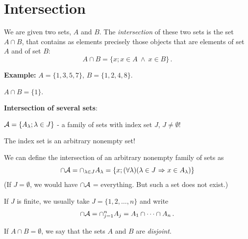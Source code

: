 \documentclass[11pt,paper=b5,footinclude,headinclude]{scrbook} %
\def\ali {{~\vee~}}
\def\inn {{~\wedge~}}
\def\sledi {{~\Rightarrow~}}
\theoremstyle{remark}
\theoremstyle{definition} %
\theoremstyle{theorem} %
\begin{document}
%
%
%
%
%
%
%
%
%
%
%
%
%
%
%
%
%
%
%
%
%
%
%
%
%
%

\section{Intersection}
We are given two sets, $A$ and $B$. The {\em intersection} of these two sets is the set $A\cap B$,
that contains as elements precisely those objects that are elements of set $A$ and of set $B$:
$$A\cap B = \{x; x\in A \inn x\in B\}\,.$$

\textbf{ Example:}
$A = \{1,3,5,7\}$, $B = \{1,2,4,8\}$.

$A\cap B = \{1\}$.

\medskip

\textbf{ Intersection of several sets}:

${\cal A} = \{A_\lambda; \lambda \in J\}$ - a family of sets with index set $J$, $J\neq \emptyset$!

The index set is an arbitrary nonempty set!

We can define the intersection of an arbitrary nonempty family of sets as
$$\cap {\cal A} = \cap_{\lambda \in J} A_\lambda = \{x;(\forall\lambda) (\lambda \in J\sledi x\in A_\lambda)\}$$
(If $J = \emptyset$, we would have $\cap {\cal A}$ = everything. But such a set does not exist.)

\medskip
If $J$ is finite, we usually take $J = \{1,2,\ldots, n\}$ and write
$$\cap {\cal A} = \cap_{j = 1}^nA_j = A_1\cap\cdots\cap A_n\,.$$

If $A\cap B = \emptyset$, we say that the sets $A$ and $B$ are {\em disjoint}.
\end{document}
